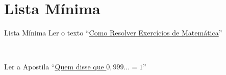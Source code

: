 \documentclass[fleqn,utf8,aspectratio=169,12pt,ignorenonframetext]{beamer}
\begin{document}
\section{Lista Mínima}

\begin{frame}{Lista Mínima}
  Ler o texto
  ``\href{https://drive.google.com/file/d/1iUuy68VWqKabrV7JxTwlyOgr59cA9G2r/view?usp=sharing}%
  {Como Resolver Exercícios de Matemática}''

  ~

  Ler a Apostila
  ``\href{https://sites.google.com/view/prof-luis-dafonseca/ensino-b\%C3\%A1sico/infinito}%
  {Quem disse que $0,999\dots=1$}''
\end{frame}

\end{document}

